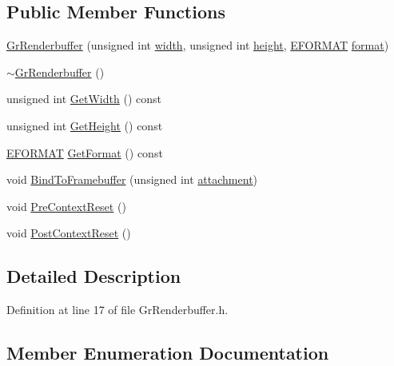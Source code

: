\begin{CompactItemize}
\subsection*{Public Member Functions}
\begin{CompactItemize}
\item 
\hyperlink{class_gr_renderbuffer_d185578b3293a38668ded97c908d7053}{GrRenderbuffer} (unsigned int \hyperlink{wglext_8h_e6531b1788ca42a9ae8155b0c52e7630}{width}, unsigned int \hyperlink{wglext_8h_b2e63df950c3789599e1e43f477bc9e3}{height}, \hyperlink{class_gr_renderbuffer_ebd137b0070a9c89e526afa508e2ad7a}{EFORMAT} \hyperlink{glext__bak_8h_e2d3db041c6004a67047659b42f73a44}{format})
\item 
\hyperlink{class_gr_renderbuffer_e122e8cab34ef92c2e745f19b9174cce}{$\sim$GrRenderbuffer} ()
\item 
unsigned int \hyperlink{class_gr_renderbuffer_057ed372253eca15b35c834e17b3cb37}{GetWidth} () const 
\item 
unsigned int \hyperlink{class_gr_renderbuffer_8853c79e467fa53b0a9c8b619f82f735}{GetHeight} () const 
\item 
\hyperlink{class_gr_renderbuffer_ebd137b0070a9c89e526afa508e2ad7a}{EFORMAT} \hyperlink{class_gr_renderbuffer_156a47cf6943e4b0714166f2eb69288d}{GetFormat} () const 
\item 
void \hyperlink{class_gr_renderbuffer_a81a6b698cc1f560c2b5e98a101611c0}{BindToFramebuffer} (unsigned int \hyperlink{glext__bak_8h_d8f97111cc6514af5f352219d1cceb40}{attachment})
\item 
void \hyperlink{class_gr_renderbuffer_736aa66655242b21c01006ddbe8e83d1}{PreContextReset} ()
\item 
void \hyperlink{class_gr_renderbuffer_b7d8c93051e190f086976ac103878890}{PostContextReset} ()
\end{CompactItemize}


\subsection{Detailed Description}


Definition at line 17 of file GrRenderbuffer.h.

\subsection{Member Enumeration Documentation}
\hypertarget{class_gr_renderbuffer_ebd137b0070a9c89e526afa508e2ad7a}{
}
\end{CompactItemize}
